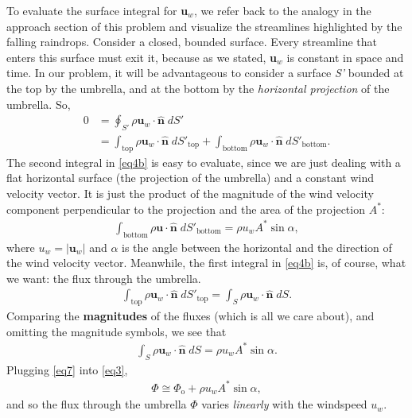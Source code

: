 \documentclass[11pt]{article}
\begin{document}
\vspace{10pt} To evaluate the surface integral for \textbf{u}$_w$, we refer back to the analogy in the approach section of this problem and visualize the streamlines highlighted by the falling raindrops. Consider a closed, bounded surface. Every streamline that enters this surface must exit it, because as we stated, \textbf{u}$_w$ is constant in space and time. In our problem, it will be advantageous to consider a surface \textit{S'} bounded at the top by the umbrella, and at the bottom by the \textit{horizontal projection} of the umbrella. So,
\begin{subequations}
\begin{align}
0 &= \oint_{S'} \rho\textbf{u}_w \cdot \hat{\textbf{n}}\; dS'  \label{eq4a} \\ 
&= \int_{\text{top}} \rho\textbf{u}_w \cdot \hat{\textbf{n}}\; dS'_{\text{top}} + \int_{\text{bottom}} \rho\textbf{u}_w \cdot \hat{\textbf{n}}\; dS'_{\text{bottom}} \label{eq4b}. 
\end{align}
\end{subequations}
The second integral in \eqref{eq4b} is easy to evaluate, since we are just dealing with a flat horizontal surface (the projection of the umbrella) and a constant wind velocity vector. It is just the product of the magnitude of the wind velocity component perpendicular to the projection and the area of the projection $A^*$:
\begin{align} \label{eq5}
\int_{\text{bottom}} \rho\textbf{u} \cdot \hat{\textbf{n}}\; dS'_{\text{bottom}} = \rho u_w A^* \sin{\alpha},
\end{align}
where $u_w = |\textbf{u}_w|$ and $\alpha$ is the angle between the horizontal and the direction of the wind velocity vector. Meanwhile, the first integral in \eqref{eq4b} is, of course, what we want: the flux through the umbrella.
\begin{align} \label{eq6}
\int_{\text{top}} \rho\textbf{u}_w \cdot \hat{\textbf{n}}\; dS'_{\text{top}} = \int_S \rho\textbf{u}_w \cdot \hat{\textbf{n}}\; dS.
\end{align}
Comparing the \textbf{magnitudes} of the fluxes (which is all we care about), and omitting the magnitude symbols, we see that
\begin{align} \label{eq7}
\int_S \rho\textbf{u}_w \cdot \hat{\textbf{n}}\; dS = \rho u_w A^* \sin{\alpha}.
\end{align}
Plugging \eqref{eq7} into \eqref{eq3},
\begin{align} \label{eq8}
\boxed{\Phi \cong \Phi_{\text{o}} + \rho u_w A^* \sin{\alpha}},
\end{align}
and so the flux through the umbrella $\Phi$ varies \textit{linearly} with the windspeed $u_w$.
\end{document}
